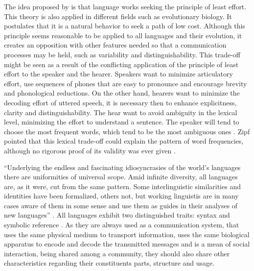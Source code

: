 The idea proposed by \cite{zipf1949} is that language works seeking the principle of least effort. 
This theory is also applied in different fields such as evolutionary biology. It postulates that
it is a natural behavior to seek a path of low cost.
Although this principle seems reasonable to be applied to all languages and their evolution,
it creates an opposition with other features needed so that a communication processes may be held,
such as variability and distinguishability. This trade-off might be seen as a result of the conflicting
application of the principle of least effort to the speaker and the hearer. Speakers want to 
minimize articulatory effort, use sequences of phones that are easy to pronounce and encourage
brevity and phonological reductions. On the other hand, hearers want to minimize the decoding effort
of uttered speech, it is necessary then to enhance explicitness, clarity and distinguishability.
The hear want to avoid ambiguity in the lexical level, minimizing the effort to understand a sentence.
The speaker will tend to choose the most frequent words, which tend to be the most ambiguous ones
\citep{gernsbacher1994, kohler1986}.
Zipf pointed that this lexical trade-off could explain the pattern of word frequencies,
although no rigorous proof of its validity was ever given \citep{zipf1949}.
 


``Underlying the endless and fascinating idiosyncrasies of the world's languages there are 
uniformities of universal scope. Amid infinite diversity, all languages are, as it were, 
cut from the same pattern. Some interlinguistic similarities and identities have been formalized, 
others not, but working linguistis are in many cases aware of them in some sense and use them as 
guides in their analyses of new languages'' \citep{greenberg1966}.
All languages exhibit two distinguished traits: syntax and symbolic reference
\citep{chomsky1968b, deacon1997}.
As they are always used as a communication system, that uses the same physical medium to 
transport information, uses the same biological apparatus to encode and decode the transmitted
messages and is a mean of social interaction, being shared among a community, they should also 
share other characteristics regarding their constituents parts, structure and usage.



